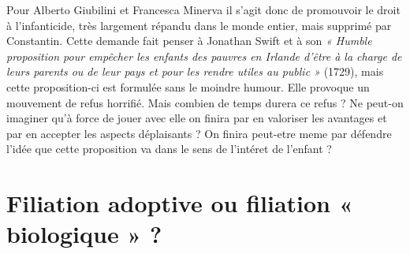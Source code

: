  Pour Alberto Giubilini et Francesca Minerva  il  s'agit donc de promouvoir le droit à l'infanticide, très largement répandu dans le monde entier, mais supprimé par Constantin. Cette demande fait penser à Jonathan Swift et à son \emph{« Humble proposition pour empêcher les enfants des pauvres en Irlande d'être à la charge de leurs parents ou de leur pays et pour les rendre utiles au public »} (1729), mais cette proposition-ci  est formulée sans le moindre humour. Elle provoque un mouvement de refus horrifié. Mais combien de temps durera ce refus ? Ne peut-on imaginer qu'à force de jouer avec elle on finira par en valoriser les avantages et par en accepter les aspects déplaisants  ? On finira peut-etre meme par défendre l'idée que cette proposition va dans le sens de l'intéret de l'enfant ?

 \chapter{Filiation adoptive ou filiation « biologique » ?} 
 
